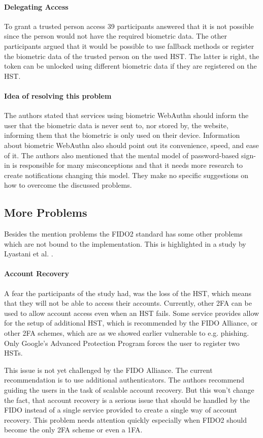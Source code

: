 \documentclass[runningheads]{llncs}
\begin{document}
\paragraph{Delegating Access}
To grant a trusted person access 39 participants answered that it is not possible since the person would not have the required biometric data. The other participants argued that it would be possible to use fallback methods or register the biometric data of the trusted person on the used HST. The latter is right, the token can be unlocked using different biometric data if they are registered on the HST.

\paragraph{Idea of resolving this problem}
The authors stated that services using biometric WebAuthn should inform the user that the biometric data is never sent to, nor stored by, the website, informing them that the biometric is only used on their device. Information about biometric WebAuthn also should point out its convenience, speed, and ease of it. The authors also mentioned that the mental model of password-based sign-in is responsible for many misconceptions and that it needs more research to create notifications changing this model. They make no specific suggestions on how to overcome the discussed problems.

\subsection{More Problems} \label{ref1}
Besides the mention problems the FIDO2 standard has some other problems which are not bound to the implementation. This is highlighted in a study by Lyastani et al. \cite{9152694}. 

\paragraph{Account Recovery}
A fear the participants of the study had, was the loss of the HST, which means that they will not be able to access their accounts. Currently, other 2FA can be used to allow account access even when an HST fails. Some service provides allow for the setup of additional HST, which is recommended by the FIDO Alliance, or other 2FA schemes, which are as we showed earlier vulnerable to e.g. phishing. Only Google's Advanced Protection Program forces the user to register two HSTs.

This issue is not yet challenged by the FIDO Alliance. The current recommendation is to use additional authenticators. The authors recommend guiding the users in the task of scalable account recovery. But this won't change the fact, that account recovery is a serious issue that should be handled by the FIDO instead of a single service provided to create a single way of account recovery. This problem needs attention quickly especially when FIDO2 should become the only 2FA scheme or even a 1FA. 
\end{document}
